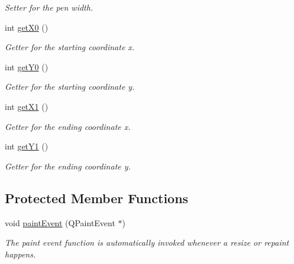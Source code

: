 \begin{DoxyCompactItemize}
\begin{DoxyCompactList}\small\item\em Setter for the pen width. \end{DoxyCompactList}\item 
int \hyperlink{class_line_a0e23ee7edc154bd73fefab4d88cae150}{get\+X0} ()
\begin{DoxyCompactList}\small\item\em Getter for the starting coordinate x. \end{DoxyCompactList}\item 
int \hyperlink{class_line_a971146fd8bbf711123f03e45daf923c9}{get\+Y0} ()
\begin{DoxyCompactList}\small\item\em Getter for the starting coordinate y. \end{DoxyCompactList}\item 
int \hyperlink{class_line_a1f51d8df03219f5f63d656bc0e9b2830}{get\+X1} ()
\begin{DoxyCompactList}\small\item\em Getter for the ending coordinate x. \end{DoxyCompactList}\item 
int \hyperlink{class_line_a9cc398fdcf93212a3e4db28ac26a88a9}{get\+Y1} ()
\begin{DoxyCompactList}\small\item\em Getter for the ending coordinate y. \end{DoxyCompactList}\end{DoxyCompactItemize}
\subsection*{Protected Member Functions}
\begin{DoxyCompactItemize}
\item 
\hypertarget{class_line_a7e1f30fa9d7375fd67a2b4cf5a1b6a76}{}void \hyperlink{class_line_a7e1f30fa9d7375fd67a2b4cf5a1b6a76}{paint\+Event} (Q\+Paint\+Event $\ast$)\label{class_line_a7e1f30fa9d7375fd67a2b4cf5a1b6a76}

\begin{DoxyCompactList}\small\item\em The paint event function is automatically invoked whenever a resize or repaint happens. \end{DoxyCompactList}\end{DoxyCompactItemize}
